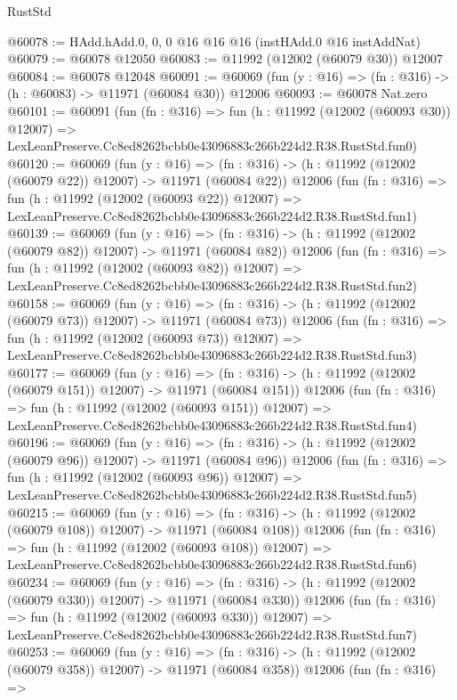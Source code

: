 \begin{lexlean}{RustStd}
\begin{coremodule}
@60078 := HAdd.hAdd.{0, 0, 0} @16 @16 @16 (instHAdd.{0} @16 instAddNat)
@60079 := @60078 @12050
@60083 := @11992 (@12002 (@60079 @30)) @12007
@60084 := @60078 @12048
@60091 := @60069 (fun (y : @16) => (fn : @316) -> (h : @60083) -> @11971 (@60084 @30)) @12006
@60093 := @60078 Nat.zero
@60101 := @60091
    (fun (fn : @316) =>
    fun (h : @11992 (@12002 (@60093 @30)) @12007) =>
    LexLeanPreserve.Cc8ed8262bcbb0e43096883c266b224d2.R38.RustStd.fun0)
@60120 := @60069
    (fun (y : @16) =>
    (fn : @316) -> (h : @11992 (@12002 (@60079 @22)) @12007) -> @11971 (@60084 @22))
    @12006
    (fun (fn : @316) =>
    fun (h : @11992 (@12002 (@60093 @22)) @12007) =>
    LexLeanPreserve.Cc8ed8262bcbb0e43096883c266b224d2.R38.RustStd.fun1)
@60139 := @60069
    (fun (y : @16) =>
    (fn : @316) -> (h : @11992 (@12002 (@60079 @82)) @12007) -> @11971 (@60084 @82))
    @12006
    (fun (fn : @316) =>
    fun (h : @11992 (@12002 (@60093 @82)) @12007) =>
    LexLeanPreserve.Cc8ed8262bcbb0e43096883c266b224d2.R38.RustStd.fun2)
@60158 := @60069
    (fun (y : @16) =>
    (fn : @316) -> (h : @11992 (@12002 (@60079 @73)) @12007) -> @11971 (@60084 @73))
    @12006
    (fun (fn : @316) =>
    fun (h : @11992 (@12002 (@60093 @73)) @12007) =>
    LexLeanPreserve.Cc8ed8262bcbb0e43096883c266b224d2.R38.RustStd.fun3)
@60177 := @60069
    (fun (y : @16) =>
    (fn : @316) -> (h : @11992 (@12002 (@60079 @151)) @12007) -> @11971 (@60084 @151))
    @12006
    (fun (fn : @316) =>
    fun (h : @11992 (@12002 (@60093 @151)) @12007) =>
    LexLeanPreserve.Cc8ed8262bcbb0e43096883c266b224d2.R38.RustStd.fun4)
@60196 := @60069
    (fun (y : @16) =>
    (fn : @316) -> (h : @11992 (@12002 (@60079 @96)) @12007) -> @11971 (@60084 @96))
    @12006
    (fun (fn : @316) =>
    fun (h : @11992 (@12002 (@60093 @96)) @12007) =>
    LexLeanPreserve.Cc8ed8262bcbb0e43096883c266b224d2.R38.RustStd.fun5)
@60215 := @60069
    (fun (y : @16) =>
    (fn : @316) -> (h : @11992 (@12002 (@60079 @108)) @12007) -> @11971 (@60084 @108))
    @12006
    (fun (fn : @316) =>
    fun (h : @11992 (@12002 (@60093 @108)) @12007) =>
    LexLeanPreserve.Cc8ed8262bcbb0e43096883c266b224d2.R38.RustStd.fun6)
@60234 := @60069
    (fun (y : @16) =>
    (fn : @316) -> (h : @11992 (@12002 (@60079 @330)) @12007) -> @11971 (@60084 @330))
    @12006
    (fun (fn : @316) =>
    fun (h : @11992 (@12002 (@60093 @330)) @12007) =>
    LexLeanPreserve.Cc8ed8262bcbb0e43096883c266b224d2.R38.RustStd.fun7)
@60253 := @60069
    (fun (y : @16) =>
    (fn : @316) -> (h : @11992 (@12002 (@60079 @358)) @12007) -> @11971 (@60084 @358))
    @12006
    (fun (fn : @316) =>

\end{coremodule}
\end{lexlean}
